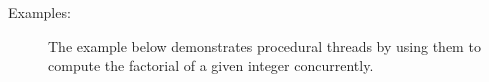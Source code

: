 \documentclass{overturerepchap}
\begin{document}
{\begin{description}
%
%
%
\item[Examples:]  \mbox{}
The example below demonstrates procedural threads by using them to
compute the factorial of a given integer concurrently.


\end{description}}
\end{document}
